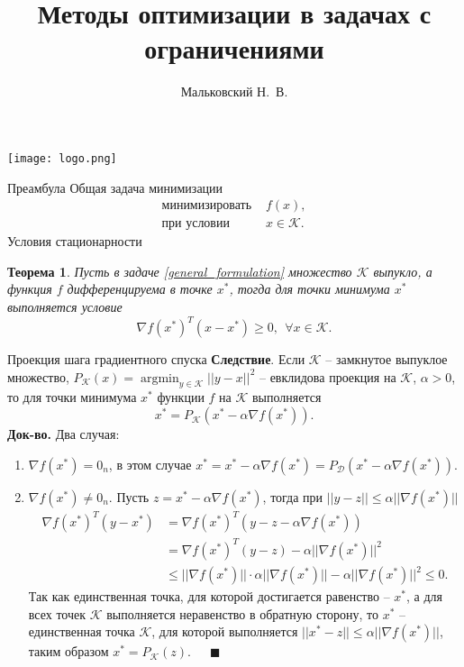 \documentclass[10pt, handout]{beamer}
\author{Мальковский Н.~В.}
\title[Задачи с ограничениями]{Методы оптимизации в задачах с ограничениями}
\institute[СПбАУ]{Санкт-Петербургский академический университет}
\date{}
\DeclareMathOperator{\argmin}{argmin}
\newcounter{thm}
\newtheorem{theorem_ru}[thm]{Теорема}
\begin{document}
\begin{frame}
\titlepage
\centering
\texttt{[image: logo.png]}
\end{frame}

\begin{frame}{Преамбула}
Общая задача минимизации
\begin{equation}\label{general_formulation}
\begin{array}{ll}
\mbox{минимизировать } & f(x),\\
\mbox{при условии } & x\in \mathcal{K}.
\end{array}
\end{equation}
\pause
Условия стационарности
\begin{theorem_ru}
Пусть в задаче \eqref{general_formulation} множество $\mathcal{K}$ выпукло, а функция $f$ дифференцируема в точке $x^*$, тогда для точки минимума $x^*$ выполняется условие
$$
\nabla f(x^*)^T(x-x^*)\geq 0,~~\forall x\in \mathcal{K}.
$$
\end{theorem_ru}
\end{frame}

\begin{frame}{Проекция шага градиентного спуска}
\textbf{Следствие}. Если $\mathcal{K}$ -- замкнутое выпуклое множество, $P_\mathcal{K}(x)=\argmin_{y\in\mathcal{K}}||y-x||^2$ -- евклидова проекция на
$\mathcal{K}$, $\alpha>0$, то для точки минимума $x^*$ функции $f$ на $\mathcal{K}$ выполняется
$$
x^*=P_\mathcal{K}(x^*-\alpha\nabla f(x^*)).
$$
\pause
\textbf{Док-во.} Два случая:
\begin{enumerate}
\item $\nabla f(x^*)=0_n$, в этом случае $x^*=x^*-\alpha\nabla f(x^*)=P_\mathcal{D}(x^*-\alpha\nabla f(x^*))$.
\item $\nabla f(x^*)\neq 0_n$. Пусть $z=x^*-\alpha\nabla f(x^*)$, тогда при $||y-z||\leq \alpha ||\nabla f(x^*)||$
\begin{align*}
\nabla f(x^*)^T(y-x^*) &= \nabla f(x^*)^T(y-z-\alpha\nabla f(x^*))\\
&=\nabla f(x^*)^T(y-z)-\alpha ||\nabla f(x^*)||^2\\
&\leq ||\nabla f(x^*)||\cdot \alpha ||\nabla f(x^*)||-\alpha ||\nabla f(x^*)||^2\leq 0.
\end{align*}
Так как единственная точка, для которой достигается равенство --  $x^*$, а для всех точек $\mathcal{K}$ выполняется неравенство в обратную сторону,
то $x^*$ -- единственная точка $\mathcal{K}$, для которой выполняется $||x^*-z||\leq \alpha ||\nabla f(x^*)||$, таким образом $x^*=P_\mathcal{K}(z)$.~~~$\blacksquare$
\end{enumerate}
\end{frame}
\end{document}
